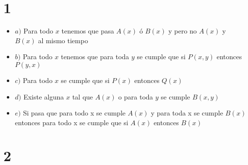 \documentclass[12pt, fleqn]{article}                            %
\theoremstyle{break}                                            %
\begin{document}
\restoregeometry                                                    %
\nopagecolor                                                        %




\tableofcontents{}
\label{sec:Index}

\clearpage


\clearpage
\section{1}

    \begin{itemize}

        \item  $a)$
            Para todo $x$ tenemos que pasa $A(x)$ ó $B(x)$ y pero no $A(x)$ y $B(x)$ al mismo tiempo

        \item  $b)$
            Para todo $x$ tenemos que para toda $y$ se cumple que si $P(x, y)$ entonces $P(y, x)$

        \item  $c)$
            Para todo $x$ se cumple que si $P(x)$ entonces $Q(x)$

        \item  $d)$
            Existe alguna $x$ tal que $A(x)$ o para toda $y$ se cumple $B(x, y)$

        \item  $e)$
            Si pasa que para todo x se cumple $A(x)$ y para toda x se cumple $B(x)$ entonces para todo x se cumple
            que si $A(x)$ entonces $B(x)$

    \end{itemize}




\clearpage
\section{2}
\end{document}

